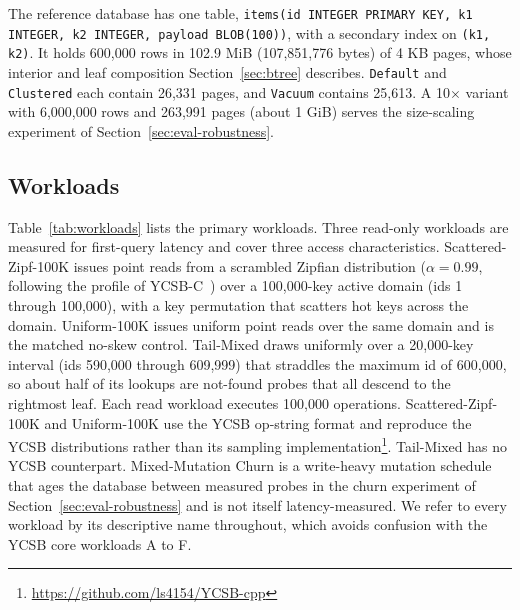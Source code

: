 \documentclass[sigconf, nonacm]{acmart}
\begin{document}
The reference database has one table, \texttt{items(id INTEGER PRIMARY KEY, k1 INTEGER, k2 INTEGER, payload BLOB(100))}, with a secondary index on \texttt{(k1, k2)}. It holds 600,000 rows in 102.9 MiB (107{,}851{,}776 bytes) of 4 KB pages, whose interior and leaf composition Section~\ref{sec:btree} describes. \texttt{Default} and \texttt{Clustered} each contain 26,331 pages, and \texttt{Vacuum} contains 25,613. A 10$\times$ variant with 6,000,000 rows and 263,991 pages (about 1 GiB) serves the size-scaling experiment of Section~\ref{sec:eval-robustness}.

\subsection{Workloads}\label{sec:workloads}

Table~\ref{tab:workloads} lists the primary workloads. Three read-only workloads are measured for first-query latency and cover three access characteristics. Scattered-Zipf-100K issues point reads from a scrambled Zipfian distribution ($\alpha = 0.99$, following the profile of YCSB-C~\cite{Cooper2010}) over a 100,000-key active domain (ids 1 through 100,000), with a key permutation that scatters hot keys across the domain. Uniform-100K issues uniform point reads over the same domain and is the matched no-skew control. Tail-Mixed draws uniformly over a 20,000-key interval (ids 590,000 through 609,999) that straddles the maximum id of 600,000, so about half of its lookups are not-found probes that all descend to the rightmost leaf. Each read workload executes 100,000 operations. Scattered-Zipf-100K and Uniform-100K use the YCSB op-string format and reproduce the YCSB distributions rather than its sampling implementation\footnote{\url{https://github.com/ls4154/YCSB-cpp}}. Tail-Mixed has no YCSB counterpart. Mixed-Mutation Churn is a write-heavy mutation schedule that ages the database between measured probes in the churn experiment of Section~\ref{sec:eval-robustness} and is not itself latency-measured. We refer to every workload by its descriptive name throughout, which avoids confusion with the YCSB core workloads A to F.
\end{document}
